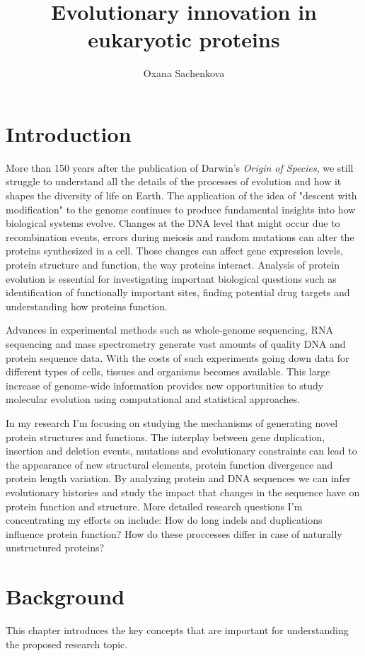 \documentclass[11pt, a4paper,oneside]{report}
\newcommand{\mychapter}[2]{
    \setcounter{chapter}{#1}
    \setcounter{section}{0}
    \chapter*{#2}
    \addcontentsline{toc}{chapter}{#2}
}
\begin{document}
\title{Evolutionary innovation in eukaryotic proteins}
\author{Oxana Sachenkova}
\date{}
\maketitle

\mychapter{0}{Introduction}
More than 150 years after the publication of Darwin's {\itshape Origin of Species}, we still struggle to understand all the details of the processes of evolution and how it shapes the diversity of life on Earth. The application of the idea of "descent with modification" to the genome continues to produce fundamental insights into how biological systems evolve. Changes at the DNA level that might occur due to recombination events, errors during meiosis and random mutations can alter the proteins synthesized in a cell. Those changes can affect gene expression levels, protein structure and function, the way proteins interact. Analysis of protein evolution is essential for investigating important biological questions such as identification of functionally important sites, finding potential drug targets and understanding how proteins function.
  
Advances in experimental methods such as whole-genome sequencing, RNA sequencing and mass spectrometry generate vast amounts of quality DNA and protein sequence data.  With the costs of such experiments going down data for different types of cells, tissues and organisms becomes available. This large increase of genome-wide information provides new opportunities to study molecular evolution using computational and statistical approaches.

In my research I'm focusing on studying the mechanisms of generating novel protein structures and functions. The interplay between gene duplication, insertion and deletion events, mutations and evolutionary constraints can lead to the appearance of new structural elements,  
protein function divergence and protein length variation. By analyzing protein and DNA sequences we can infer evolutionary histories and study the impact that changes in the sequence have on protein function and structure.  More detailed research questions I'm concentrating my efforts on include: How do long indels and duplications influence protein function? How do these proccesses differ in case of naturally unstructured proteins? 

\mychapter{1}{Background}

This chapter introduces the key concepts that are important for understanding the proposed research topic. 
\end{document}
